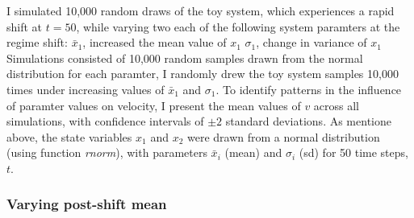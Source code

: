 \documentclass[12pt,twoside,openany]{reedthesis}
\begin{document}
I simulated 10,000 random draws of the toy system, which experiences a
rapid shift at \(t = 50\), while varying two each of the following
system paramters at the regime shift: \(\bar{x}_1\), increased the mean
value of \(x_1\) \(\sigma_1\), change in variance of \(x_1\) Simulations
consisted of 10,000 random samples drawn from the normal distribution
for each paramter, I randomly drew the toy system samples 10,000 times
under increasing values of \(\bar{x}_1\) and \(\sigma_1\). To identify
patterns in the influence of paramter values on velocity, I present the
mean values of \(v\) across all simulations, with confidence intervals
of \(\pm 2\) standard deviations. As mentione above, the state variables
\(x_1\) and \(x_2\) were drawn from a normal distribution (using
function \emph{rnorm}), with parameters \(\bar{x}_i\) (mean) and
\(\sigma_i\) (sd) for 50 time steps, \(t\).

\subsubsection{Varying post-shift mean}\label{varying-post-shift-mean}
\end{document}
